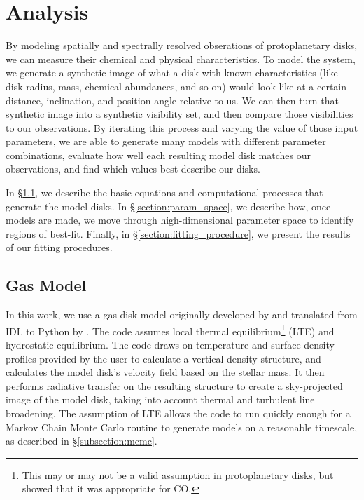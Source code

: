 \chapter{Analysis}
\label{chap:analysis}

By modeling spatially and spectrally resolved obserations of protoplanetary disks, we can measure their chemical and physical characteristics. To model the system, we generate a synthetic image of what a disk with known characteristics (like disk radius, mass, chemical abundances, and so on) would look like at a certain distance, inclination, and position angle relative to us. We can then turn that synthetic image into a synthetic visibility set, and then compare those visibilities to our observations. By iterating this process and varying the value of those input parameters, we are able to generate many models with different parameter combinations, evaluate how well each resulting model disk matches our observations, and find which values best describe our disks.


In \S\ref{section:gas_model}, we describe the basic equations and computational processes that generate the model disks. In \S\ref{section:param_space}, we describe how, once models are made, we move through high-dimensional parameter space to identify regions of best-fit. Finally, in \S\ref{section:fitting_procedure}, we present the results of our fitting procedures.


\section{Gas Model}
\label{section:gas_model}

In this work, we use a gas disk model originally developed by \citet{Rosenfeld2012,Rosenfeld2013} and translated from IDL to Python by \cite{Flaherty2015}. The code assumes local thermal equilibrium\footnote{This may or may not be a valid assumption in protoplanetary disks, but \cite{Pavlyuchenkov2007} showed that it was appropriate for CO.} (LTE) and hydrostatic equilibrium. The code draws on temperature and surface density profiles provided by the user to calculate a vertical density structure, and calculates the model disk's velocity field based on the stellar mass. It then performs radiative transfer on the resulting structure to create a sky-projected image of the model disk, taking into account thermal and turbulent line broadening. The assumption of LTE allows the code to run quickly enough for a Markov Chain Monte Carlo routine to generate models on a reasonable timescale, as described in \S\ref{subsection:mcmc}.




